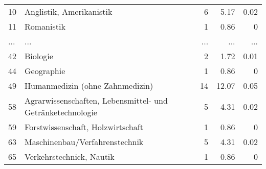 \begin{longtable}{lXrrr}
        10 & \multicolumn{1}{X}{Anglistik, Amerikanistik} & %
          \num{6} &
          \num[round-mode=places,round-precision=2]{5,17} &
          \num[round-mode=places,round-precision=2]{0,02} \\
        11 & \multicolumn{1}{X}{Romanistik} & %
          \num{1} &
          \num[round-mode=places,round-precision=2]{0,86} &
          \num[round-mode=places,round-precision=2]{0} \\
       ... & ... & ... & ... & ... \\
        42 & \multicolumn{1}{X}{Biologie} & %
          \num{2} &
          \num[round-mode=places,round-precision=2]{1,72} &
          \num[round-mode=places,round-precision=2]{0,01} \\

        44 & \multicolumn{1}{X}{Geographie} & %
          \num{1} &
          \num[round-mode=places,round-precision=2]{0,86} &
          \num[round-mode=places,round-precision=2]{0} \\

        49 & \multicolumn{1}{X}{Humanmedizin (ohne Zahnmedizin)} & %
          \num{14} &
          \num[round-mode=places,round-precision=2]{12,07} &
          \num[round-mode=places,round-precision=2]{0,05} \\

        58 & \multicolumn{1}{X}{Agrarwissenschaften, Lebensmittel- und Getränketechnologie} & %
          \num{5} &
          \num[round-mode=places,round-precision=2]{4,31} &
          \num[round-mode=places,round-precision=2]{0,02} \\

        59 & \multicolumn{1}{X}{Forstwissenschaft, Holzwirtschaft} & %
          \num{1} &
          \num[round-mode=places,round-precision=2]{0,86} &
          \num[round-mode=places,round-precision=2]{0} \\

        63 & \multicolumn{1}{X}{Maschinenbau/Verfahrenstechnik} & %
          \num{5} &
          \num[round-mode=places,round-precision=2]{4,31} &
          \num[round-mode=places,round-precision=2]{0,02} \\

        65 & \multicolumn{1}{X}{Verkehrstechnick, Nautik} & %
          \num{1} &
          \num[round-mode=places,round-precision=2]{0,86} &
          \num[round-mode=places,round-precision=2]{0} \\


\end{longtable}
